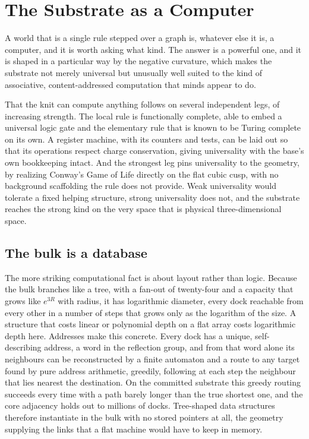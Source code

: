 \section{The Substrate as a Computer}

A world that is a single rule stepped over a graph is, whatever else it is, a computer, and it is worth asking what kind. The answer is a powerful one, and it is shaped in a particular way by the negative curvature, which makes the substrate not merely universal but unusually well suited to the kind of associative, content-addressed computation that minds appear to do.

That the knit can compute anything follows on several independent legs, of increasing strength. The local rule is functionally complete, able to embed a universal logic gate and the elementary rule that is known to be Turing complete on its own. A register machine, with its counters and tests, can be laid out so that its operations respect charge conservation, giving universality with the base's own bookkeeping intact. And the strongest leg pins universality to the geometry, by realizing Conway's Game of Life directly on the flat cubic cusp, with no background scaffolding the rule does not provide. Weak universality would tolerate a fixed helping structure, strong universality does not, and the substrate reaches the strong kind on the very space that is physical three-dimensional space.

\subsection{The bulk is a database}

The more striking computational fact is about layout rather than logic. Because the bulk branches like a tree, with a fan-out of twenty-four and a capacity that grows like $e^{3R}$ with radius, it has logarithmic diameter, every dock reachable from every other in a number of steps that grows only as the logarithm of the size. A structure that costs linear or polynomial depth on a flat array costs logarithmic depth here. Addresses make this concrete. Every dock has a unique, self-describing address, a word in the reflection group, and from that word alone its neighbours can be reconstructed by a finite automaton and a route to any target found by pure address arithmetic, greedily, following at each step the neighbour that lies nearest the destination. On the committed substrate this greedy routing succeeds every time with a path barely longer than the true shortest one, and the core adjacency holds out to millions of docks. Tree-shaped data structures therefore instantiate in the bulk with no stored pointers at all, the geometry supplying the links that a flat machine would have to keep in memory.

